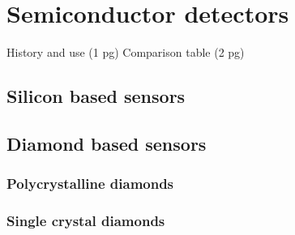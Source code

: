 \documentclass[12pt]{packages/mytustyle}  %
\begin{document}
\section{Semiconductor detectors}
History and use (1 pg)
Comparison table (2 pg)

\subsection{Silicon based sensors}

\subsection{Diamond based sensors}
\subsubsection{Polycrystalline diamonds}
\subsubsection{Single crystal diamonds}




\end{document}
